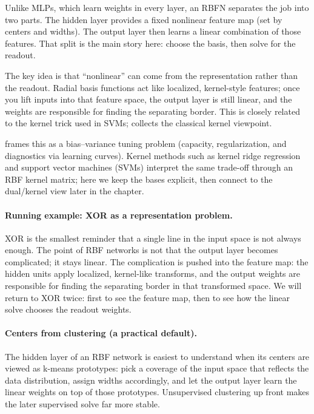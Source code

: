 Unlike MLPs, which learn weights in every layer, an RBFN separates the job into two parts. The hidden layer provides a fixed nonlinear feature map (set by centers and widths). The output layer then learns a linear combination of those features. That split is the main story here: choose the basis, then solve for the readout.

The key idea is that ``nonlinear'' can come from the representation rather than the readout. Radial basis functions act like localized, kernel-style features; once you lift inputs into that feature space, the output layer is still linear, and the weights are responsible for finding the separating border. This is closely related to the kernel trick used in SVMs;  collects the classical kernel viewpoint.

 frames this as a bias--variance tuning problem (capacity, regularization, and diagnostics via learning curves). Kernel methods such as kernel ridge regression and support vector machines (SVMs) interpret the same trade-off through an RBF kernel matrix; here we keep the bases explicit, then connect to the dual/kernel view later in the chapter.

\paragraph{Running example: XOR as a representation problem.}
XOR is the smallest reminder that a single line in the input space is not always enough. The point of RBF networks is not that the output layer becomes complicated; it stays linear. The complication is pushed into the feature map: the hidden units apply localized, kernel-like transforms, and the output weights are responsible for finding the separating border in that transformed space. We will return to XOR twice: first to see the feature map, then to see how the linear solve chooses the readout weights.

\paragraph{Centers from clustering (a practical default).}
The hidden layer of an RBF network is easiest to understand when its centers are viewed as k\hyp{}means prototypes: pick a coverage of the input space that reflects the data distribution, assign widths accordingly, and let the output layer learn the linear weights on top of those prototypes. Unsupervised clustering up front makes the later supervised solve far more stable.


